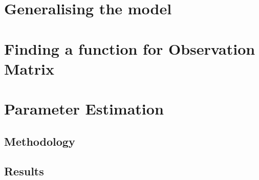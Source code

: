 \section{Generalising the model}

\section{Finding a function for Observation Matrix}

\section{Parameter Estimation}

\subsection{Methodology}

\subsection{Results}